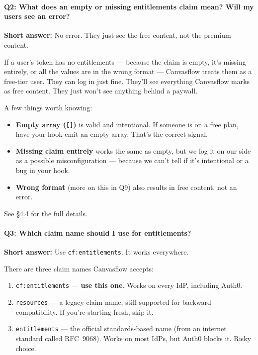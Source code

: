 \paragraph{Q2: What does an empty or missing entitlements claim mean? Will my users see
an error?}

\textbf{Short answer:} No error. They just see the free content, not the premium content.

If a user's token has no entitlements --- because the claim is empty, it's missing
entirely, or all the values are in the wrong format --- Canvasflow treats them as a
free-tier user. They can log in just fine. They'll see everything Canvasflow marks as
free content. They just won't see anything behind a paywall.

A few things worth knowing:
\begin{itemize}
  \item \textbf{Empty array (\texttt{[]})} is valid and intentional. If someone is on a
    free plan, have your hook emit an empty array. That's the correct signal.
  \item \textbf{Missing claim entirely} works the same as empty, but we log it on our
    side as a possible misconfiguration --- because we can't tell if it's intentional or a
    bug in your hook.
  \item \textbf{Wrong format} (more on this in Q9) also results in free content, not an
    error.
\end{itemize}

See \hyperref[sec:free-content-baseline]{\S4.4} for the full details.

\pagebreak

\paragraph{Q3: Which claim name should I use for entitlements?}

\textbf{Short answer:} Use \texttt{cf:entitlements}. It works everywhere.

There are three claim names Canvasflow accepts:
\begin{enumerate}
  \item \texttt{cf:entitlements} --- \textbf{use this one}. Works on every IdP, including
    Auth0.
  \item \texttt{resources} --- a legacy claim name, still supported for backward
    compatibility. If you're starting fresh, skip it.
  \item \texttt{entitlements} --- the official standards-based name (from an internet
    standard called RFC~9068). Works on most IdPs, but Auth0 blocks it. Risky choice.
\end{enumerate}

